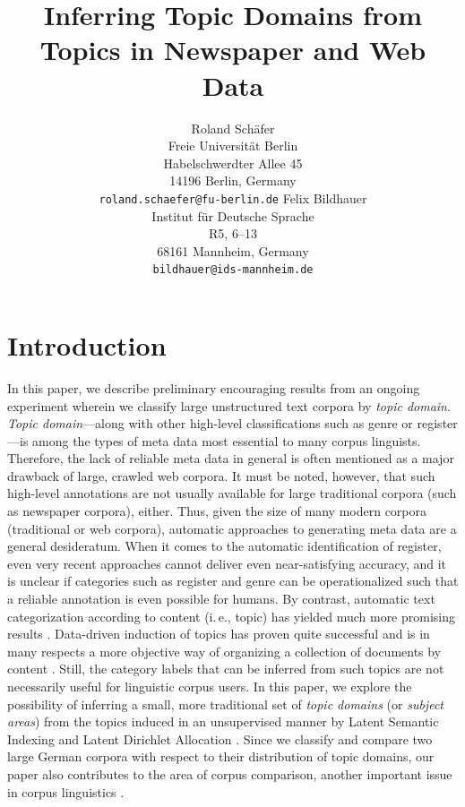 \documentclass[11pt]{article}
\title{Inferring Topic Domains from Topics in Newspaper and Web Data}
\author{Roland Schäfer\\
	    Freie Universität Berlin\\
	    Habelschwerdter Allee 45\\
	    14196 Berlin, Germany\\
	    {\tt roland.schaefer@fu-berlin.de}
	  \And
	Felix Bildhauer\\
  	Institut für Deutsche Sprache\\
  	R5, 6--13\\
  	68161 Mannheim, Germany\\
  {\tt bildhauer@ids-mannheim.de}}
\date{}
\begin{document}
\maketitle


\section{Introduction}
\label{sec:introduction}
In this paper, we describe preliminary encouraging results from an ongoing experiment wherein we classify large unstructured text corpora by \textit{topic domain}.
\textit{Topic domain}---along with other high-level classifications such as genre or register---is among the types of meta data most essential to many corpus linguists.
Therefore, the lack of reliable meta data in general is often mentioned as a major drawback of large, crawled web corpora.
It must be noted, however, that such high-level annotations are not usually available for large traditional corpora (such as newspaper corpora), either.
Thus, given the size of many modern corpora (traditional or web corpora), automatic approaches to generating meta data are a general desideratum.
When it comes to the automatic identification of register, even very recent approaches \cite{BiberEgbert2016} cannot deliver even near-satisfying accuracy, and it is unclear if categories such as register and genre can be operationalized such that a reliable annotation is even possible for humans.
By contrast, automatic text categorization according to content (i.\,e., topic) has yielded much more promising results \cite{Sebastiani2002}.
Data-driven induction of topics has proven quite successful and is in many respects a more objective way of organizing a collection of documents by content \cite{Eagles1996}.
Still, the category labels that can be inferred from such topics are not necessarily useful for linguistic corpus users.
In this paper, we explore the possibility of inferring a small, more traditional set of \textit{topic domains} (or \textit{subject areas}) from the topics induced in an unsupervised manner by Latent Semantic Indexing \cite{LandauerDumais1994,LandauerDumais1997,LSAHandbook} and Latent Dirichlet Allocation \cite{BleiEa2003}.
Since we classify and compare two large German corpora with respect to their distribution of topic domains, our paper also contributes to the area of corpus comparison, another important issue in corpus linguistics \cite{Kilgarriff2001,BiemannEa2013}.
\end{document}
